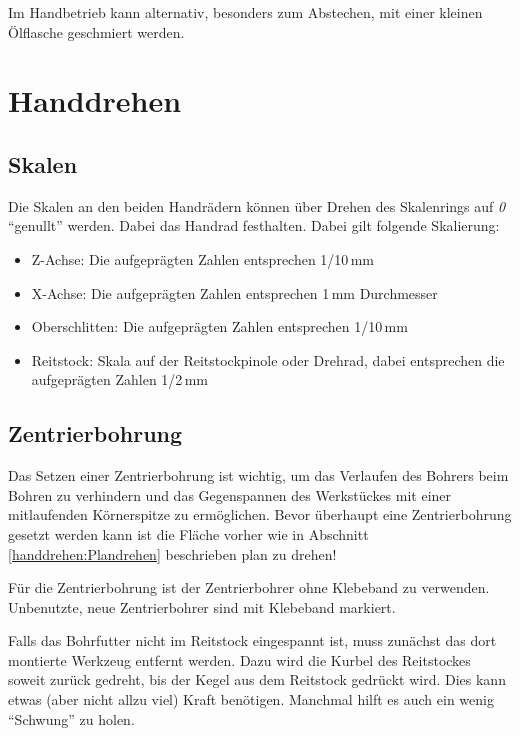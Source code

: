 \documentclass{\basedir/fablab-document}
\begin{document}
Im Handbetrieb kann alternativ, besonders zum Abstechen, mit einer kleinen Ölflasche geschmiert werden. 

\newpage
\section{Handdrehen}
\label{handdrehen}
\subsection{Skalen}

Die Skalen an den beiden Handrädern können über Drehen des Skalenrings auf \emph{0} \enquote{genullt} werden.
Dabei das Handrad festhalten.
Dabei gilt folgende Skalierung:
\begin{itemize}
\item Z-Achse: Die aufgeprägten Zahlen entsprechen 1/10\,mm 
\item X-Achse: Die aufgeprägten Zahlen entsprechen 1\,mm Durchmesser
\item Oberschlitten: Die aufgeprägten Zahlen entsprechen 1/10\,mm 
\item Reitstock: Skala auf der Reitstockpinole oder Drehrad, dabei entsprechen die aufgeprägten Zahlen 1/2\,mm
\end{itemize}


\subsection{Zentrierbohrung}
\label{handdrehen:zentrierbohrung}
Das Setzen einer Zentrierbohrung ist wichtig, um das Verlaufen des Bohrers beim Bohren zu verhindern
und das Gegenspannen des Werkstückes mit einer mitlaufenden Körnerspitze zu ermöglichen.
Bevor überhaupt eine Zentrierbohrung gesetzt werden kann ist die Fläche vorher wie in
Abschnitt \ref{handdrehen:Plandrehen} beschrieben plan zu drehen!


Für die Zentrierbohrung ist der Zentrierbohrer ohne Klebeband zu verwenden.
Unbenutzte, neue Zentrierbohrer sind mit Klebeband markiert.

Falls das Bohrfutter nicht im Reitstock eingespannt ist, muss zunächst das dort montierte Werkzeug entfernt werden.
Dazu wird die Kurbel des Reitstockes soweit zurück gedreht, bis der  Kegel aus dem Reitstock gedrückt wird.
Dies kann etwas (aber nicht allzu viel) Kraft benötigen.
Manchmal hilft es auch ein wenig \enquote{Schwung} zu holen.
\end{document}
